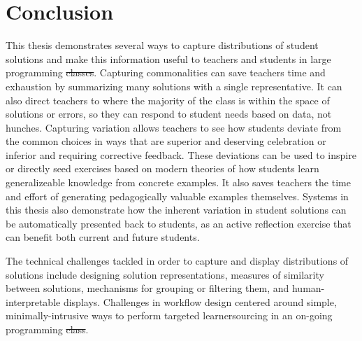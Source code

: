 \documentclass[12pt,twoside]{mitthesis}
\providecommand{\DIFaddtex}[1]{{\protect\color{blue}\uwave{#1}}} %
\providecommand{\DIFdeltex}[1]{{\protect\color{red}\sout{#1}}}                      %
\providecommand{\DIFaddbegin}{} %
\providecommand{\DIFaddend}{} %
\providecommand{\DIFdelbegin}{} %
\providecommand{\DIFdelend}{} %
\providecommand{\DIFadd}[1]{\texorpdfstring{\DIFaddtex{#1}}{#1}} %
\providecommand{\DIFdel}[1]{\texorpdfstring{\DIFdeltex{#1}}{}} %
\begin{document}

%
\pagestyle{plain}
%

\pagestyle{fancyplain}
\addtolength{\headheight}{\baselineskip}

%
%
%
%
%
%
%
\chapter{Conclusion}\label{chapter:conclusion}

This thesis demonstrates several ways to capture distributions of student solutions and make this information useful to teachers and students in large programming \DIFdelbegin \DIFdel{classes}\DIFdelend \DIFaddbegin \DIFadd{courses}\DIFaddend . Capturing commonalities can save teachers time and exhaustion by summarizing many solutions with a single representative. It can also direct teachers to where the majority of the class is within the space of solutions or errors, so they can respond to student needs based on data, not hunches. Capturing variation allows teachers to see how students deviate from the common choices in ways that are superior and deserving celebration or inferior and requiring corrective feedback. These deviations can be used to inspire or directly seed exercises based on modern theories of how students learn generalizeable knowledge from concrete examples. It also saves teachers the time and effort of generating pedagogically valuable examples themselves. Systems in this thesis also demonstrate how the inherent variation in student solutions can be automatically presented back to students, as an active reflection exercise that can benefit both current and future students. 

The technical challenges tackled in order to capture and display distributions of solutions include designing solution representations, measures of similarity between solutions, mechanisms for grouping or filtering them, and human-interpretable displays. Challenges in workflow design centered around simple, minimally-intrusive ways to perform targeted learnersourcing in an on-going programming \DIFdelbegin \DIFdel{class}\DIFdelend \DIFaddbegin \DIFadd{course}\DIFaddend .
\end{document}
